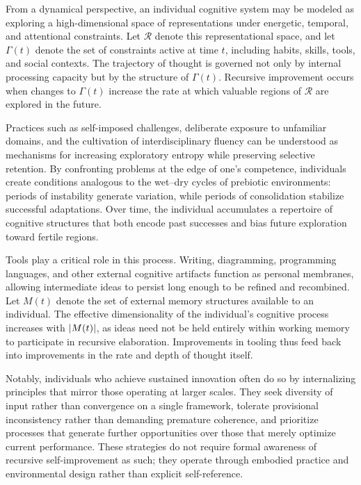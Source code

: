 \documentclass[11pt]{article}
\begin{document}
From a dynamical perspective, an individual cognitive system may be modeled as exploring a high-dimensional space of representations under energetic, temporal, and attentional constraints. Let $\mathcal{R}$ denote this representational space, and let $\Gamma(t)$ denote the set of constraints active at time $t$, including habits, skills, tools, and social contexts. The trajectory of thought is governed not only by internal processing capacity but by the structure of $\Gamma(t)$. Recursive improvement occurs when changes to $\Gamma(t)$ increase the rate at which valuable regions of $\mathcal{R}$ are explored in the future.

Practices such as self-imposed challenges, deliberate exposure to unfamiliar domains, and the cultivation of interdisciplinary fluency can be understood as mechanisms for increasing exploratory entropy while preserving selective retention. By confronting problems at the edge of one’s competence, individuals create conditions analogous to the wet--dry cycles of prebiotic environments: periods of instability generate variation, while periods of consolidation stabilize successful adaptations. Over time, the individual accumulates a repertoire of cognitive structures that both encode past successes and bias future exploration toward fertile regions.

Tools play a critical role in this process. Writing, diagramming, programming languages, and other external cognitive artifacts function as personal membranes, allowing intermediate ideas to persist long enough to be refined and recombined. Let $M(t)$ denote the set of external memory structures available to an individual. The effective dimensionality of the individual’s cognitive process increases with $\abs{M(t)}$, as ideas need not be held entirely within working memory to participate in recursive elaboration. Improvements in tooling thus feed back into improvements in the rate and depth of thought itself.

Notably, individuals who achieve sustained innovation often do so by internalizing principles that mirror those operating at larger scales. They seek diversity of input rather than convergence on a single framework, tolerate provisional inconsistency rather than demanding premature coherence, and prioritize processes that generate further opportunities over those that merely optimize current performance. These strategies do not require formal awareness of recursive self-improvement as such; they operate through embodied practice and environmental design rather than explicit self-reference.
\end{document}
